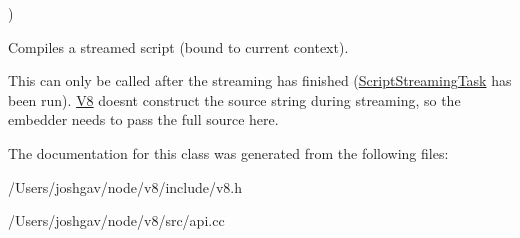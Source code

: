 {\begin{DoxyParamCaption}
\end{DoxyParamCaption}
)\hspace{0.3cm}{\ttfamily [static]}}\hypertarget{classv8_1_1_script_compiler_a60c0b0605f19607cce32e3eb776be13e}{}\label{classv8_1_1_script_compiler_a60c0b0605f19607cce32e3eb776be13e}
Compiles a streamed script (bound to current context).

This can only be called after the streaming has finished (\hyperlink{classv8_1_1_script_compiler_1_1_script_streaming_task}{Script\+Streaming\+Task} has been run). \hyperlink{classv8_1_1_v8}{V8} doesn\textquotesingle{}t construct the source string during streaming, so the embedder needs to pass the full source here. 

The documentation for this class was generated from the following files\+:\begin{DoxyCompactItemize}
\item 
/\+Users/joshgav/node/v8/include/v8.\+h\item 
/\+Users/joshgav/node/v8/src/api.\+cc\end{DoxyCompactItemize}
